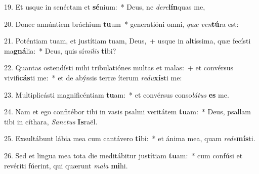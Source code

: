 19. Et usque in senéctam et \textbf{sé}nium:~* Deus, ne \textit{de}\textit{re}\textbf{lín}quas me,

20. Donec annúntiem bráchium \textbf{tu}um~* generatióni omni, \textit{quæ} \textit{ven}\textbf{tú}ra est:

21. Poténtiam tuam, et justítiam tuam, Deus,~+ usque in altíssima, quæ fecísti ma\textbf{gná}lia:~* Deus, quis sí\textit{mi}\textit{lis} \textbf{ti}bi?

22. Quantas ostendísti mihi tribulatiónes multas et malas:~+ et convérsus vivifi\textbf{cás}ti me:~* et de abýssis terræ íterum \textit{re}\textit{du}\textbf{xís}ti me:

23. Multiplicásti magnificéntiam \textbf{tu}am:~* et convérsus conso\textit{lá}\textit{tus} \textbf{es} me.

24. Nam et ego confitébor tibi in vasis psalmi veritátem \textbf{tu}am:~* Deus, psallam tibi in cíthara, \textit{Sanc}\textit{tus} \textbf{Is}raël.

25. Exsultábunt lábia mea cum cantávero \textbf{ti}bi:~* et ánima mea, quam \textit{red}\textit{e}\textbf{mís}ti.

26. Sed et lingua mea tota die meditábitur justítiam \textbf{tu}am:~* cum confúsi et revériti fúerint, qui quærunt \textit{ma}\textit{la} \textbf{mi}hi.